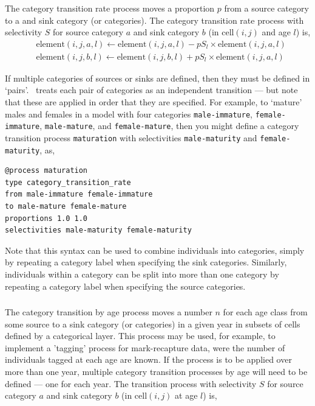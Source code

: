 The category transition rate process moves a proportion $p$ from a source category to a and sink category (or categories). The category transition rate process with selectivity $S$ for source category $a$ and sink category $b$ (in cell$(i,j)$ and age $l$) is,
\begin{equation}\begin{split}
  & \text{element}(i,j,a,l) \leftarrow \text{element}(i,j,a,l) - pS_l \times \text{element}(i,j,a,l) \\
  & \text{element}(i,j,b,l) \leftarrow \text{element}(i,j,b,l) + pS_l \times \text{element}(i,j,a,l)
\end{split}\end{equation}

If multiple categories of sources or sinks are defined, then they must be defined in `pairs'. \SPM\ treats each pair of categories as an independent transition --- but note that these are applied in order that they are specified. For example, to `mature' males and females in a model with four categories \texttt{male-immature}, \texttt{female-immature}, \texttt{male-mature}, and \texttt{female-mature}, then you might define a category transition process \texttt{maturation} with selectivities \texttt{male-maturity} and \texttt{female-maturity}, as,
{\small{\begin{verbatim}
@process maturation
type category_transition_rate
from male-immature female-immature
to male-mature female-mature
proportions 1.0 1.0
selectivities male-maturity female-maturity
\end{verbatim}}}

Note that this syntax can be used to combine individuals into categories, simply by repeating a category label when specifying the sink categories. Similarly, individuals within a category can be split into more than one category by repeating a category label when specifying the source categories.

\subsubsection*{}

The category transition by age process moves a number $n$ for each age class from some source to a sink category (or categories) in a given year in subsets of cells defined by a categorical layer. This process may be used, for example, to implement a 'tagging' process for mark-recapture data, were the number of individuals tagged at each age are known. If the process is to be applied over more than one year, multiple category transition processes by age will need to be defined --- one for each year. The transition process with selectivity $S$ for source category $a$ and sink category $b$ (in cell$(i,j)$ at age $l$) is,

